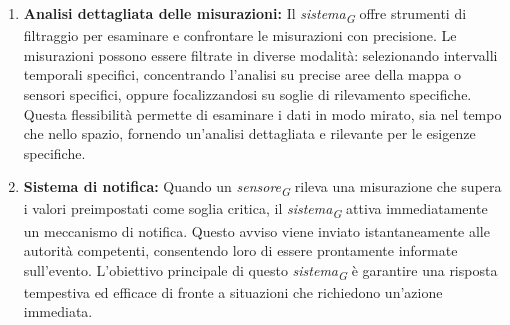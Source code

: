 \begin{enumerate}
    \item \textbf{Analisi dettagliata delle misurazioni:} Il \textit{sistema}\textsubscript{\textit{G}} offre strumenti di filtraggio per esaminare e confrontare le misurazioni con precisione. Le misurazioni possono essere filtrate in diverse modalità: selezionando intervalli temporali specifici, concentrando l'analisi su precise aree della mappa o sensori specifici, oppure focalizzandosi su soglie di rilevamento specifiche. Questa flessibilità permette di esaminare i dati in modo mirato, sia nel tempo che nello spazio, fornendo un'analisi dettagliata e rilevante per le esigenze specifiche.
    
    \item \textbf{Sistema di notifica:} Quando un \textit{sensore}\textsubscript{\textit{G}} rileva una misurazione che supera i valori preimpostati come soglia critica, il \textit{sistema}\textsubscript{\textit{G}} attiva immediatamente un meccanismo di notifica. Questo avviso viene inviato istantaneamente alle autorità competenti, consentendo loro di essere prontamente informate sull'evento. L'obiettivo principale di questo \textit{sistema}\textsubscript{\textit{G}} è garantire una risposta tempestiva ed efficace di fronte a situazioni che richiedono un'azione immediata.
\end{enumerate}